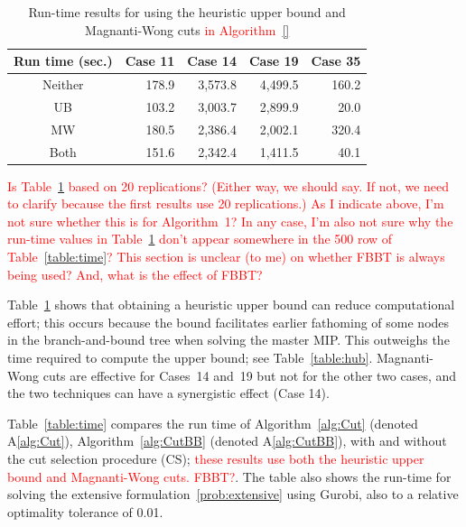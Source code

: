 \documentclass[11pt]{article}
\newcommand{\tcr}{\textcolor{red}}
\begin{document}
	\begin{table}[H]
		\centering		
		\begin{tabular}{ c | r r r r }
			\hline
			Run time (sec.) & Case 11 & Case 14 & Case 19 & Case 35 \\ \hline
			Neither & 178.9 & 3,573.8 & 4,499.5 & 160.2 \\
			UB & 103.2 & 3,003.7 & 2,899.9 & 20.0\\
			MW & 180.5 & 2,386.4 & 2,002.1 & 320.4\\
			Both & 151.6 & 2,342.4 & 1,411.5 & 40.1\\
			\hline
		\end{tabular}
		\caption{Run-time results for using the heuristic upper bound and Magnanti-Wong cuts \tcr{in Algorithm~\ref{}}}
		\label{table:heuristics}
	\end{table}
	
	\tcr{Is Table~\ref{table:heuristics} based on 20 replications? (Either way, we should say. If not, we need to clarify because the first results use 20 replications.) As I indicate above, I'm not sure whether this is for Algorithm~1? In any case, I'm also not sure why the run-time values in Table~\ref{table:heuristics} don't appear somewhere in the 500 row of Table~\ref{table:time}? This section is unclear (to me) on whether FBBT is always being used? And, what is the effect of FBBT?}
	
	Table~\ref{table:heuristics} shows that obtaining a heuristic upper bound can reduce computational effort; this occurs because the bound facilitates earlier fathoming of some nodes in the branch-and-bound tree when solving the master MIP. This outweighs the time required to compute the upper bound; see Table~\ref{table:hub}. Magnanti-Wong cuts are effective for Cases~14 and~19 but not for the other two cases, and the two techniques can have a synergistic effect (Case 14). 
	
	Table~\ref{table:time} compares the run time of Algorithm~\ref{alg:Cut} (denoted A\ref{alg:Cut}), Algorithm~\ref{alg:CutBB} (denoted A\ref{alg:CutBB}), with and without the cut selection procedure (CS); \tcr{these results use both the heuristic upper bound and Magnanti-Wong cuts. FBBT?}. The table also shows the run-time for solving the extensive formulation~\eqref{prob:extensive} using Gurobi, also to a relative optimality tolerance of 0.01. 
	
\end{document}
